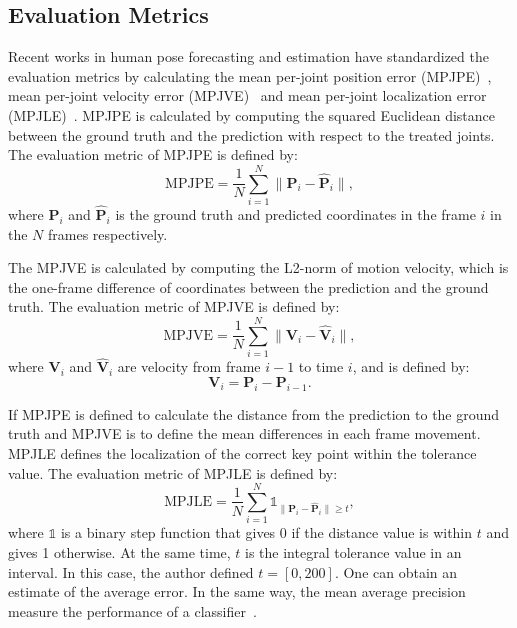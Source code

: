 

\subsection{Evaluation Metrics}\label{3:2D_evaluation}
Recent works in human pose forecasting and estimation have standardized the evaluation metrics by calculating the mean per-joint position error (MPJPE)~\cite{fragkiadaki2015recurrent, martinez2017, jain2016, wang2019, chiu2019, Mao2019, Sofianos2021, motionmixer2022}, mean per-joint velocity error (MPJVE)~\cite{Zhao2019, Pavllo2019} and mean per-joint localization error (MPJLE)~\cite{human3.6m}. MPJPE is calculated by computing the squared Euclidean distance between the ground truth and the prediction with respect to the treated joints.
The evaluation metric of MPJPE is defined by:
\begin{equation}\label{eq:mpjpe}
    \mathrm{MPJPE} =
        \frac{1}{N}
        \sum_{i=1}^{N} 
        \| \mathbf{P}_{i} - \mathbf{\hat{P}}_{i} \|,
\end{equation}
where $\mathbf{P}_{i}$ and $\hat{\mathbf{P}}_{i}$ is the ground truth and predicted coordinates in the frame $i$ in the $N$ frames respectively.

The MPJVE is calculated by computing the L2-norm of motion velocity, which is the one-frame difference of coordinates between the prediction and the ground truth.
The evaluation metric of MPJVE is defined by:
\begin{equation}
    \label{eq:mpjve}
    \mathrm{MPJVE} =
        \frac{1}{N}
        \sum_{i=1}^{N}
        \| \mathbf{V}_{i} - \mathbf{\hat{V}}_{i} \|,
\end{equation}
where $\mathbf{V}_{i}$ and $\mathbf{\hat{V}}_{i}$ are velocity from frame $i-1$ to time $i$, and is defined by:
\begin{equation}
    \label{eq:mpjve_velocity}
    \mathbf{V}_{i} = \mathbf{P}_{i} - \mathbf{P}_{i - 1}.
\end{equation}

If MPJPE is defined to calculate the distance from the prediction to the ground truth and MPJVE is to define the mean differences in each frame movement. MPJLE defines the localization of the correct key point within the tolerance value. The evaluation metric of MPJLE is defined by:
\begin{equation}\label{eq:mpjle}
    \mathrm{MPJLE} =
        \frac{1}{N} 
        \sum_{i=1}^{N}
        \mathds{1}_{\| \mathbf{P}_{i} - \mathbf{\hat{P}}_{i} \| \ge t},
\end{equation}
where $\mathds{1}$ is a binary step function that gives 0 if the distance value is within $t$ and gives 1 otherwise. At the same time, $t$ is the integral tolerance value in an interval. In this case, the author defined $t = [0, 200]$. One can obtain an estimate of the average error. In the same way, the mean average precision measure the performance of a classifier~\cite{human3.6m}.

